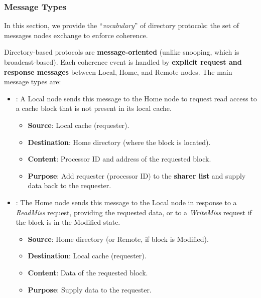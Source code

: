 \subsubsection{Message Types}\label{sec:directory-protocols:message-types}

In this section, we provide the ``\emph{vocabulary}'' of directory protocols: the set of messages nodes exchange to enforce coherence.

\highspace
Directory-based protocols are \textbf{message-oriented} (unlike snooping, which is broadcast-based). Each coherence event is handled by \textbf{explicit request and response messages} between Local, Home, and Remote nodes. The main message types are:
\begin{itemize}
    \item {}: A Local node sends this message to the Home node to request read access to a cache block that is not present in its local cache.
    \begin{itemize}
        \item[\textcolor{Green3}{\faIcon{arrow-right}}] \textcolor{Green3}{\textbf{Source}}: Local cache (requester).
        \item[\textcolor{Green3}{\faIcon{arrow-left}}] \textcolor{Green3}{\textbf{Destination}}: Home directory (where the block is located).
        \item[\textcolor{Green3}{\faIcon{file-alt}}] \textcolor{Green3}{\textbf{Content}}: Processor ID and address of the requested block.
        \item[\textcolor{Green3}{\faIcon{question-circle}}] \textcolor{Green3}{\textbf{Purpose}}: Add requester (processor ID) to the \textbf{sharer list} and supply data back to the requester.
    \end{itemize}


    \item {}: The Home node sends this message to the Local node in response to a \emph{ReadMiss} request, providing the requested data, or to a \emph{WriteMiss} request if the block is in the Modified state.
    \begin{itemize}
        \item[\textcolor{Green3}{\faIcon{arrow-right}}] \textcolor{Green3}{\textbf{Source}}: Home directory (or Remote, if block is Modified).
        \item[\textcolor{Green3}{\faIcon{arrow-left}}] \textcolor{Green3}{\textbf{Destination}}: Local cache (requester).
        \item[\textcolor{Green3}{\faIcon{file-alt}}] \textcolor{Green3}{\textbf{Content}}: Data of the requested block.
        \item[\textcolor{Green3}{\faIcon{question-circle}}] \textcolor{Green3}{\textbf{Purpose}}: Supply data to the requester.
    \end{itemize}



\end{itemize}
